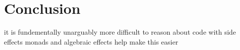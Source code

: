 \documentclass[a4paper,10pt]{article}
\theoremstyle{definition}
\begin{document}
\pagebreak
\tableofcontents

\pagebreak


\pagebreak


\pagebreak


\pagebreak


\pagebreak


\pagebreak
\section{Conclusion}
it is fundementally unarguably more difficult to reason about code with side effects
monads and algebraic effects help make this easier

\pagebreak
\appendix



\pagebreak


\end{document}
